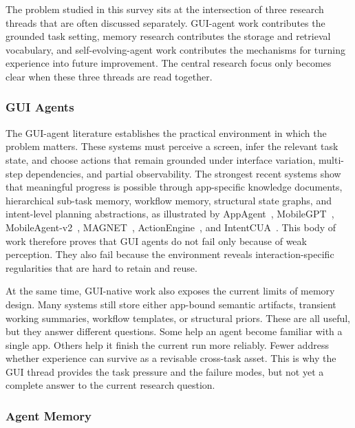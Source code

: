 \documentclass{article}
\begin{document}
The problem studied in this survey sits at the intersection of three
research threads that are often discussed separately. GUI-agent work
contributes the grounded task setting, memory research contributes the
storage and retrieval vocabulary, and self-evolving-agent work
contributes the mechanisms for turning experience into future
improvement. The central research focus only becomes clear when these
three threads are read together.

\subsubsection{GUI Agents}\label{311-gui-agents}

The GUI-agent literature establishes the practical environment in which
the problem matters. These systems must perceive a screen, infer the
relevant task state, and choose actions that remain grounded under
interface variation, multi-step dependencies, and partial observability.
The strongest recent systems show that meaningful progress is possible
through app-specific knowledge documents, hierarchical sub-task memory,
workflow memory, structural state graphs, and intent-level planning
abstractions, as illustrated by AppAgent~\parencite{zhang2023appagent},
MobileGPT~\parencite{lee2024mobilegpt},
MobileAgent-v2~\parencite{wang2024mobileagentv2},
MAGNET~\parencite{sun2026magnet},
ActionEngine~\parencite{zhong2026actionengine}, and
IntentCUA~\parencite{lee2026intentcua}. This body of work therefore
proves that GUI agents do not fail only because of weak perception.
They also fail because the environment reveals interaction-specific
regularities that are hard to retain and reuse.

At the same time, GUI-native work also exposes the current limits of
memory design. Many systems still store either app-bound semantic
artifacts, transient working summaries, workflow templates, or
structural priors. These are all useful, but they answer different
questions. Some help an agent become familiar with a single app. Others
help it finish the current run more reliably. Fewer address whether
experience can survive as a revisable cross-task asset. This is why the
GUI thread provides the task pressure and the failure modes, but not yet
a complete answer to the current research question.

\subsubsection{Agent Memory}\label{312-agent-memory}
\end{document}
